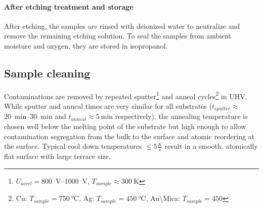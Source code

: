 \paragraph{After etching treatment and storage}
After etching, the samples are rinsed with deionized water to neutralize and remove the remaining etching solution. To seal the samples from ambient moisture and oxygen, they are stored in isopropanol.


\subsection{Sample cleaning}
\label{sec:sample-cleaning}
Contaminations 
are removed by repeated sputter\footnote{$U_{accel}=$\SIrange{800}{1000}{\volt}, $T_{sample}\approx \SI{300}{\kelvin}$} and anneal cycles\footnote{Cu: $T_{sample}=\SI{750}{\celsius}$, Ag: $T_{sample}=\SI{450}{\celsius}$, Au\textbackslash Mica: $T_{sample}= 450$} in UHV. While sputter and anneal times are very similar for all substrates ($t_{sputter}\approx$ \SIrange{20}{30}{\minute} and $t_{anneal}\approx \SI{5}{\minute}$ respectively), the annealing temperature is chosen well below the melting point of the substrate but high enough to allow contamination segregation from the bulk to the surface and atomic reordering at the surface. Typical cool down temperatures $\leq 5 \frac{K}{s}$ result in a smooth, atomically flat surface with large terrace size. 

